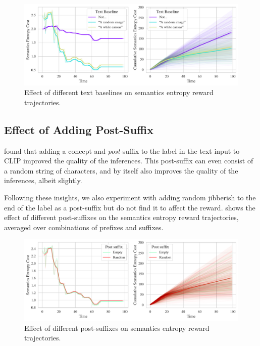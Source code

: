 \begin{figure}[h]
    \centering
    \includegraphics[width=\textwidth]{images/baseline_comparison.pdf}
    \caption{Effect of different text baselines on semantics entropy reward trajectories.}
    \label{fig:baseline}
\end{figure}

\subsection{Effect of Adding Post-Suffix}
\label{sec:post-suffix}
\cite{waffleclip} found that adding a concept and \emph{post-}suffix to the label in the text input to CLIP improved the quality of the inferences.
This post-suffix can even consist of a random string of characters, and by itself also improves the quality of the inferences, albeit slightly.

Following these insights, we also experiment with adding random jibberish to the end of the label as a post-suffix but do not find it to affect the reward.
\footnotemark[1] shows the effect of different post-suffixes on the semantics entropy reward trajectories, averaged over combinations of prefixes and suffixes.


\begin{figure}[H]
    \centering
    \includegraphics[width=\textwidth]{images/post_suffix_comparison.pdf}
    \caption{Effect of different post-suffixes on semantics entropy reward trajectories.}
    \label{fig:post-suffix}
\end{figure}

